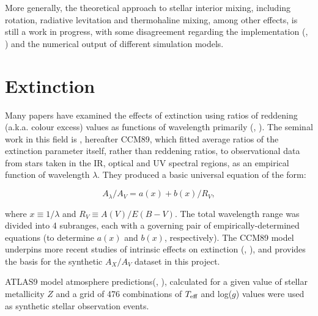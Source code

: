 \documentclass[12pt, a4paper]{report}
\begin{document}
More generally, the theoretical approach to stellar interior mixing, including rotation, radiative levitation and thermohaline mixing, among other effects, is still a work in progress, with some disagreement regarding the implementation (\cite{2010ApJ...723..563D}, \cite{2013A&A...553A...1M}) and the numerical output \citep{2015MNRAS.446.2673L} of different simulation models.

\section{Extinction}
Many papers have examined the effects of extinction using ratios of reddening (a.k.a. colour excess) values as functions of wavelength primarily (\cite{1979ARA&A..17...73S},  \cite{1988ApJ...328..734F}). The seminal work in this field is \cite{1989ApJ...345..245C}, hereafter CCM89, which fitted average ratios of the extinction parameter itself, rather than reddening ratios, to observational data from stars taken in the IR, optical \citep{1988ESASP.281b.215C} and UV \citep{1988ApJ...328..734F} spectral regions, as an empirical function of wavelength $\lambda$. They produced a basic universal equation of the form:


\begin{equation}
A_{\lambda}/A_{V} = a(x) + b(x)/R_{V},
\label{CCM_general}
\end{equation}

where $x \equiv 1/\lambda$ and $R_{V} \equiv A(V)/E(B-V)$. The total wavelength range was divided into 4 subranges, each with a governing pair of empirically-determined equations (to determine $a(x)$ and $b(x)$, respectively). The CCM89 model underpins more recent studies of intrinsic effects on extinction (\cite{2008PASP..120..583G}, \cite{2018MNRAS.479L.102C}), and provides the basis for the synthetic $A_{X}/A_{V}$ dataset in this project.

ATLAS9 model atmosphere predictions(\cite{1997A&A...318..841C}, \cite{1993KurCD..13.....K}), calculated for a given value of stellar metallicity $Z$ and a grid of 476 combinations of $T_{\textnormal{eff}}$ and log($g$) values \citep{2004astro.ph..5087C} were used as synthetic stellar observation events.
\end{document}
